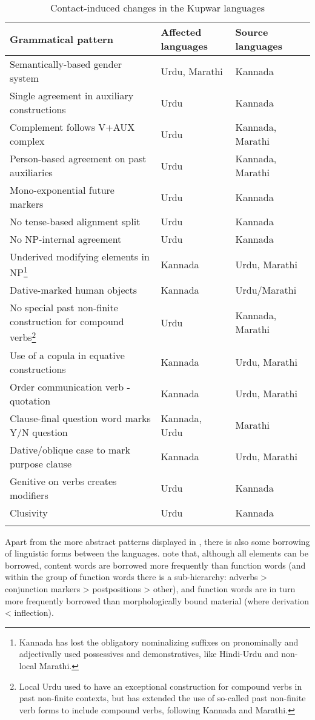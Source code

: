 \documentclass[output=paper]{langscibook}
\begin{document}
\begin{table}
\caption{Contact-induced changes in the Kupwar languages}  
\label{tab-kupwar}
 \begin{tabular}{p{7cm} p{2cm} p{2cm}} 
  \lsptoprule
  Grammatical pattern & Affected languages & Source languages\\ 
  \midrule
 Semantically-based gender system &   Urdu, Marathi & Kannada \\
 Single agreement in auxiliary constructions & Urdu &  Kannada \\
 Complement follows V+AUX complex & Urdu & Kannada, Marathi \\
 Person-based agreement on past auxiliaries  &  Urdu  &  Kannada, Marathi \\
 Mono-exponential future markers & Urdu & Kannada \\
 No tense-based alignment split & Urdu & Kannada \\
 No NP-internal agreement & Urdu & Kannada \\
 Underived modifying elements in NP\footnote{Kannada has lost the obligatory nominalizing suffixes on pronominally and adjectivally used possessives and demonstratives, like Hindi-Urdu and non-local Marathi.} & Kannada & Urdu, Marathi \\
 Dative-marked human objects & Kannada & Urdu/Marathi \\
 No special past non-finite construction for compound verbs\footnote{Local Urdu used to have an exceptional construction for compound verbs in past non-finite contexts, but has extended the use of so-called past non-finite verb forms to include compound verbs, following Kannada and Marathi.} & Urdu & Kannada, Marathi \\
 Use of a copula in equative constructions & Kannada & Urdu, Marathi \\
 Order communication verb - quotation & Kannada & Urdu, Marathi \\
 Clause-final question word marks Y/N question & Kannada, Urdu & Marathi \\
 Dative/oblique case to mark purpose clause & Kannada & Urdu, Marathi \\
 Genitive on verbs creates modifiers & Urdu & Kannada \\
 Clusivity & Urdu & Kannada \\
  \lspbottomrule
 \end{tabular}
\end{table}

Apart from the more abstract patterns displayed in , there is also some borrowing of linguistic forms between the languages. \textcite[161]{gumperzetal1971convergence} note that, although all elements can be borrowed, content words are borrowed more frequently than function words (and within the group of function words there is a sub-hierarchy: adverbs > conjunction markers > postpositions > other), and function words are in turn more frequently borrowed than morphologically bound material (where derivation < inflection).
\end{document}
